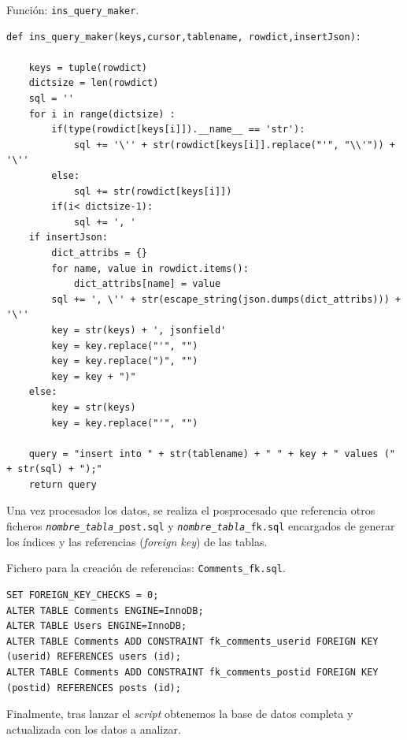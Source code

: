 \documentclass[a4paper, 12pt]{book}
\begin{document}
\begin{listing}[t]
    \caption{Función: \texttt{ins\_query\_maker}.}{}
    \label{lst:1}
    \begin{verbatim}
def ins_query_maker(keys,cursor,tablename, rowdict,insertJson):
   
    keys = tuple(rowdict)
    dictsize = len(rowdict)
    sql = ''
    for i in range(dictsize) :
        if(type(rowdict[keys[i]]).__name__ == 'str'):
            sql += '\'' + str(rowdict[keys[i]].replace("'", "\\'")) + '\''
        else:
            sql += str(rowdict[keys[i]])
        if(i< dictsize-1):
            sql += ', '
    if insertJson:
        dict_attribs = {}
        for name, value in rowdict.items():
            dict_attribs[name] = value
        sql += ', \'' + str(escape_string(json.dumps(dict_attribs))) + '\''
        key = str(keys) + ', jsonfield'
        key = key.replace("'", "")
        key = key.replace(")", "")
        key = key + ")"
    else:
        key = str(keys)
        key = key.replace("'", "")

    query = "insert into " + str(tablename) + " " + key + " values (" + str(sql) + ");"
    return query
    \end{verbatim}
\end{listing}

Una vez procesados los datos, se realiza el posprocesado que referencia otros ficheros \texttt{\emph{nombre\_tabla}\_post.sql} y \texttt{\emph{nombre\_tabla}\_fk.sql} encargados de generar los índices y las referencias (\textit{foreign key}) de las tablas.  

\begin{listing}[t]
    \caption{Fichero para la creación de referencias: \texttt{Comments\_fk.sql}.}{}
    \label{lst:2}
    \begin{verbatim}
SET FOREIGN_KEY_CHECKS = 0;
ALTER TABLE Comments ENGINE=InnoDB;
ALTER TABLE Users ENGINE=InnoDB;
ALTER TABLE Comments ADD CONSTRAINT fk_comments_userid FOREIGN KEY (userid) REFERENCES users (id);
ALTER TABLE Comments ADD CONSTRAINT fk_comments_postid FOREIGN KEY (postid) REFERENCES posts (id);
    \end{verbatim}
\end{listing}

Finalmente, tras lanzar el \emph{script} obtenemos la base de datos completa y actualizada con los datos a analizar.
\end{document}
